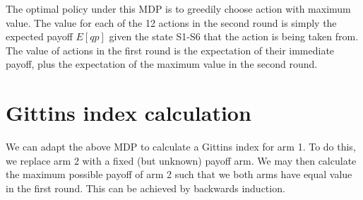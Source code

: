 \documentclass[11pt,a4,singlespacing,titlepagenumber=on]{scrreprt}
\numberwithin{equation}{chapter} %
\theoremstyle{remark}
\begin{document}
The optimal policy under this MDP is to greedily choose action with maximum value. The value for each of the 12 actions in the second round is simply the expected payoff $E[qp]$ given the state S1-S6 that the action is being taken from. The value of actions in the first round is the expectation of their immediate payoff, plus the expectation of the maximum value in the second round.

\section{Gittins index calculation}

We can adapt the above MDP to calculate a Gittins index for arm 1. To do this, we replace arm 2 with a fixed (but unknown) payoff arm. We may then calculate the maximum possible payoff of arm 2 such that we both arms have equal value in the first round. This can be achieved by backwards induction.
\end{document}
